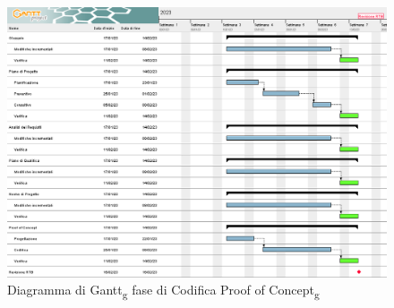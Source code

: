 \begin{figure}[H]
    \centering
    \includegraphics[scale=0.56]{image/gantt_terzo_periodo.png}
    \caption{Diagramma di Gantt\textsubscript{g} fase di Codifica Proof of Concept\textsubscript{g}}
\end{figure}
\pagebreak